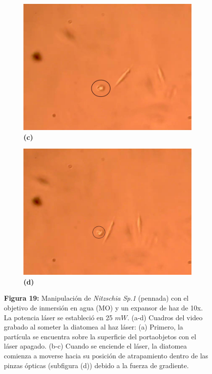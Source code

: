\documentclass[10pt,aspectratio=1610,compress,dvipsnames]{beamer}
\begin{document}
\begin{frame}
{\begin{figure}
  \begin{subfigure}[b]{0.2\linewidth}
    \includegraphics[width=\linewidth]{Results/Resultadosalgea2/secondalgeawater3.png} %
    \caption*{\textbf{(c)}}
    \label{fig7:c}
  \end{subfigure}\hspace{0.5cm} %
  \begin{subfigure}[b]{0.2\linewidth}
    \includegraphics[width=\linewidth]{Results/Resultadosalgea2/secondalgeawater4.png} %
    \caption*{\textbf{(d)}}
    \label{fig7:d}
  \end{subfigure}
   \captionsetup{labelformat = empty}
  \caption{\textbf{Figura 19: }
Manipulación de \textit{Nitzschia Sp.1} (pennada) con el objetivo de inmersión en agua (MO) y un expansor de haz de 10x. La potencia láser se estableció en 25 $mW$. (a-d) Cuadros del video grabado al someter la diatomea al haz láser: (a) Primero, la partícula se encuentra sobre la superficie del portaobjetos con el láser apagado. (b-c) Cuando se enciende el láser, la diatomea comienza a moverse hacia su posición de atrapamiento dentro de las pinzas ópticas (subfigura (d)) debido a la fuerza de gradiente. }
  \label{poresfrustrules}
\end{figure}


}
\end{frame}
\end{document}
